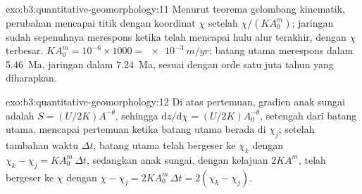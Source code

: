 \begin{solution}{exo:b3:quantitative-geomorphology:11}
Menurut teorema gelombang kinematik, perubahan mencapai titik dengan koordinat
$\chi$ setelah $\chi/(KA_0^m)$; jaringan sudah sepenuhnya merespons ketika telah
mencapai hulu alur terakhir, dengan $\chi$ terbesar. $K A_0^m = 10^{-6}\times
1000 = \qty{e-3}{m/yr}$: batang utama merespons dalam \qty{5.46}{Ma}, jaringan
dalam \qty{7.24}{Ma}, sesuai dengan orde satu juta tahun yang diharapkan.
\end{solution}

\begin{solution}{exo:b3:quantitative-geomorphology:12}
Di atas pertemuan, gradien  anak sungai adalah $S = (U/2K)A^{-\theta}$,
sehingga $\mathrm{d}z/\mathrm{d}\chi = (U/2K)A_0^{-\theta}$, setengah dari batang utama.
 mencapai pertemuan ketika batang utama berada di $\chi_j$; setelah
tambahan waktu $\Delta t$, batang utama telah bergeser ke $\chi_k$ dengan $\chi_k -
\chi_j = K A_0^m\,\Delta t$, sedangkan anak sungai, dengan kelajuan $2KA^m$,
telah bergeser ke $\chi$ dengan $\chi - \chi_j = 2KA_0^m\,\Delta t = 2(\chi_k -
\chi_j)$.
\end{solution}

